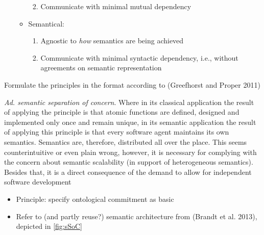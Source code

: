 \documentclass[a4paper,11pt,oneside,oldfontcommands]{memoir}
\newcounter{para}
\theoremstyle{definition}
\theoremstyle{break}		%
\numberwithin{equation}{chapter}
\numberwithin{figure}{chapter}
\begin{document}
\begin{itemize}
\begin{itemize}
    \begin{enumerate}
    \def\labelenumi{\arabic{enumi}.}
    \tightlist
    \item
      Communicate with minimal mutual dependency
    \end{enumerate}
  \item
    Semantical:

    \begin{enumerate}
    \def\labelenumi{\roman{enumi}.}
    \tightlist
    \item
      Agnostic to \emph{how} semantics are being achieved
    \item
      Communicate with minimal syntactic dependency, i.e., without
      agreements on semantic representation
    \end{enumerate}
  \end{itemize}
\end{itemize}

Formulate the principles in the format according to (Greefhorst and
Proper 2011)

\emph{Ad. semantic separation of concern}. Where in its classical
application the result of applying the principle is that atomic
functions are defined, designed and implemented only once and remain
unique, in its semantic application the result of applying this
principle is that every software agent maintains its own semantics.
Semantics are, therefore, distributed all over the place. This seems
counterintuitive or even plain wrong, however, it is necessary for
complying with the concern about semantic scalability (in support of
heterogeneous semantics). Besides that, it is a direct consequence of
the demand to allow for independent software development

\begin{itemize}
\tightlist
\item
  Principle: specify ontological commitment as basic
\item
  Refer to (and partly reuse?) semantic architecture from (Brandt et al.
  2013), depicted in \cref{fig:sSoC}
\end{itemize}
\end{document}

